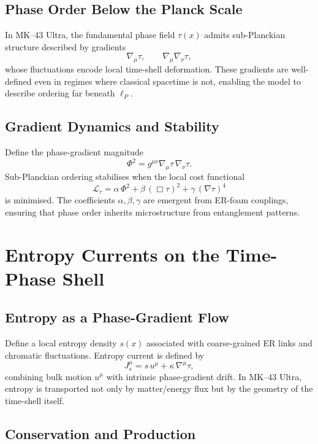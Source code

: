 \section{Phase Order Below the Planck Scale}

In MK--43 Ultra, the fundamental phase field $\tau(x)$ admits sub-Planckian structure described by gradients
\[
\nabla_\mu \tau,\qquad \nabla_\mu \nabla_\nu \tau,
\]
whose fluctuations encode local time-shell deformation.
These gradients are well-defined even in regimes where classical spacetime is not, enabling the model to describe ordering far beneath $\ell_P$.

\section{Gradient Dynamics and Stability}

Define the phase-gradient magnitude
\[
\Phi^2 = g^{\mu\nu} \nabla_\mu \tau\, \nabla_\nu \tau.
\]
Sub-Planckian ordering stabilises when the local cost functional
\[
\mathcal{L}_\tau = \alpha\, \Phi^2 + \beta\, (\Box \tau)^2 + \gamma\, (\nabla \tau)^4
\]
is minimised.
The coefficients $\alpha,\beta,\gamma$ are emergent from ER-foam couplings, ensuring that phase order inherits microstructure from entanglement patterns.


\chapter{Entropy Currents on the Time-Phase Shell}

\section{Entropy as a Phase-Gradient Flow}

Define a local entropy density $s(x)$ associated with coarse-grained ER links and chromatic fluctuations.
Entropy current is defined by
\[
J^\mu_s = s\, u^\mu + \kappa\, \nabla^\mu \tau,
\]
combining bulk motion $u^\mu$ with intrinsic phase-gradient drift.
In MK--43 Ultra, entropy is transported not only by matter/energy flux but by the geometry of the time-shell itself.

\section{Conservation and Production}


